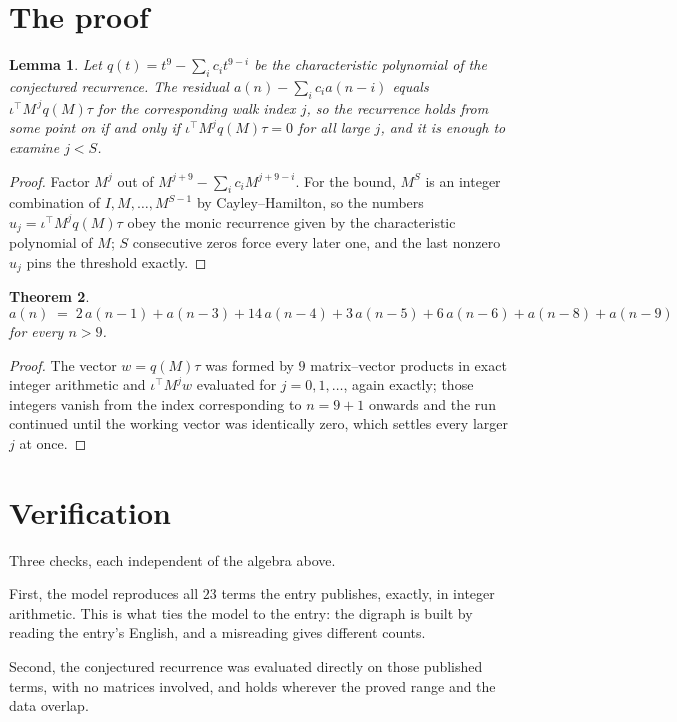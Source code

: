\documentclass[11pt,a4paper]{article}
\theoremstyle{plain}
\newtheorem{theorem}{Theorem}
\newtheorem{lemma}[theorem]{Lemma}
\theoremstyle{definition}
\begin{document}
\section{The proof}

\begin{lemma}\label{lem:crit}
Let $q(t)=t^{9}-\sum_i c_it^{9-i}$ be the characteristic polynomial of the
conjectured recurrence. The residual $a(n)-\sum_ic_ia(n-i)$ equals
$\iota^{\!\top}M^{\,j}q(M)\tau$ for the corresponding walk index $j$, so the recurrence
holds from some point on if and only if $\iota^{\!\top}M^{j}q(M)\tau=0$ for all large $j$,
and it is enough to examine $j<S$.
\end{lemma}

\begin{proof}
Factor $M^{j}$ out of $M^{j+9}-\sum_ic_iM^{j+9-i}$. For the bound, $M^{S}$
is an integer combination of $I,M,\dots,M^{S-1}$ by Cayley--Hamilton, so the numbers
$u_j=\iota^{\!\top}M^{j}q(M)\tau$ obey the monic recurrence given by the characteristic
polynomial of $M$; $S$ consecutive zeros force every later one, and the last nonzero $u_j$
pins the threshold exactly.
\end{proof}

\begin{theorem}
\[
a(n)\;=\;2\,a(n-1) + a(n-3) + 14\,a(n-4) + 3\,a(n-5) + 6\,a(n-6) + a(n-8) + a(n-9)
\]
for every $n>9$.
\end{theorem}

\begin{proof}
The vector $w=q(M)\tau$ was formed by $9$ matrix--vector products in exact integer
arithmetic and $\iota^{\!\top}M^{j}w$ evaluated for $j=0,1,\dots$, again exactly; those
integers vanish from the index corresponding to $n=9+1$ onwards and the run continued
until the working vector was identically zero, which settles every larger $j$ at once.
\end{proof}

\section{Verification}

Three checks, each independent of the algebra above.

First, the model reproduces all $23$ terms the entry publishes, exactly, in integer
arithmetic. This is what ties the model to the entry: the digraph is built by reading the
entry's English, and a misreading gives different counts.

Second, the conjectured recurrence was evaluated directly on those published terms, with no
matrices involved, and holds wherever the proved range and the data overlap.
\end{document}
